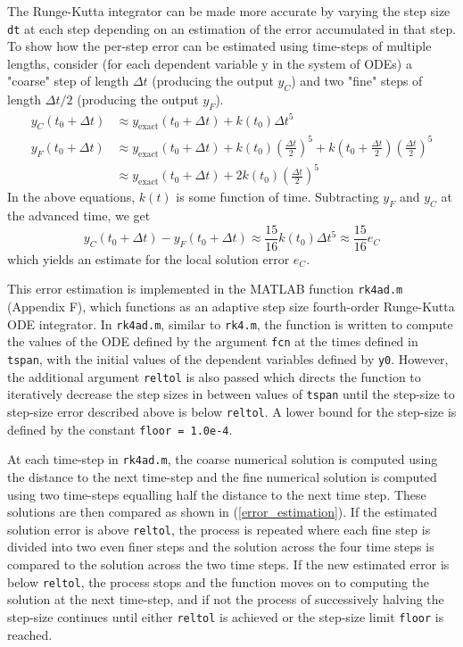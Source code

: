 \documentclass[10pt]{article}
\def\code#1{\texttt{#1}} %
\begin{document}
The Runge-Kutta integrator can be made more accurate by varying the step size \code{dt} at each step 
depending on an estimation of the error accumulated in that step. To show how the per-step error can be
estimated using time-steps of multiple lengths, consider (for each dependent variable y in the system of 
ODEs) a "coarse" step of length $\Delta t$ (producing the output $y_C$) and two "fine" steps of length 
$\Delta t / 2$ (producing the output $y_F$).
\begin{align*}\label{y_F_and_y_C}
y_C(t_0 + \Delta t) &\approx y_{\text{exact}}(t_0 + \Delta t) + k(t_0) \Delta t^5 \\
y_F(t_0 + \Delta t) &\approx y_{\text{exact}}(t_0 + \Delta t) + k(t_0) \left( \frac{\Delta t}{2} 
\right)^5 + k\left(t_0 + \frac{\Delta t}{2}\right) \left( \frac{\Delta t}{2} \right)^5 \\
&\approx y_{\text{exact}}(t_0 + \Delta t) + 2 k(t_0) \left( \frac{\Delta t}{2} \right)^5
\end{align*}
In the above equations, $k(t)$ is some function of time. Subtracting $y_F$ and $y_C$ at the advanced time,
we get
\begin{equation}\label{error_estimation}
y_C(t_0 + \Delta t) - y_F(t_0 + \Delta t) \approx \frac{15}{16}k(t_0) \Delta t^5 \approx \frac{15}{16}e_C
\end{equation}
which yields an estimate for the local solution error $e_C$.

This error estimation is implemented in the MATLAB function \code{rk4ad.m} (Appendix F), which functions 
as an adaptive step size fourth-order Runge-Kutta ODE integrator. In \code{rk4ad.m}, similar to 
\code{rk4.m}, the function is written to compute the values of the ODE defined by the argument \code{fcn}
at the times defined in \code{tspan}, with the initial values of the dependent variables defined by 
\code{y0}. However, the additional argument \code{reltol} is also passed which directs the function to 
iteratively decrease the step sizes in between values of \code{tspan} until the step-size to step-size 
error described above is below \code{reltol}. A lower bound for the step-size is defined by the constant 
\code{floor = 1.0e-4}.

At each time-step in \code{rk4ad.m}, the coarse numerical solution is computed using the distance to the 
next time-step and the fine numerical solution is computed using two time-steps equalling half the 
distance to the next time step. These solutions are then compared as shown in (\ref{error_estimation}). If 
the estimated solution error is above \code{reltol}, the process is repeated where each fine step is 
divided into two even finer steps and the solution across the four time steps is compared to the solution
across the two time steps. If the new estimated error is below \code{reltol}, the process stops and the 
function moves on to computing the solution at the next time-step, and if not the process of successively 
halving the step-size continues until either \code{reltol} is achieved or the step-size limit \code{floor}
is reached. 
\end{document}
